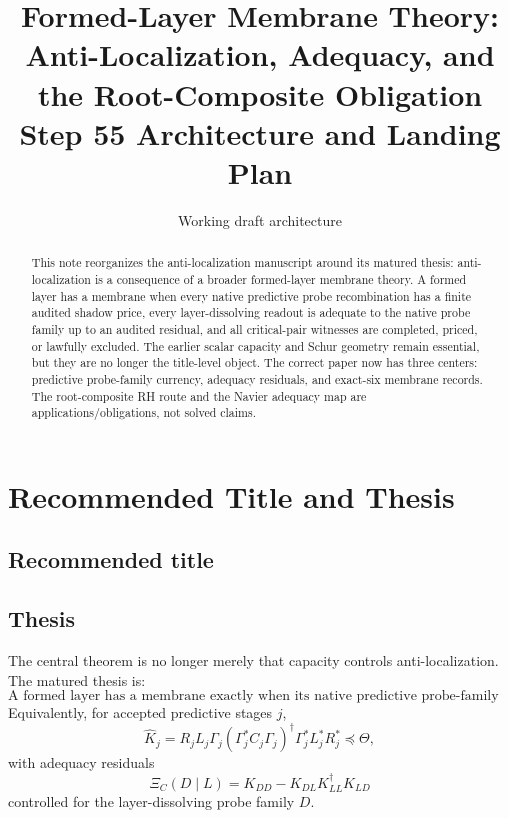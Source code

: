 \documentclass[11pt]{article}
\title{Formed-Layer Membrane Theory:\\ Anti-Localization, Adequacy, and the Root-Composite Obligation\\\large Step 55 Architecture and Landing Plan}
\author{Working draft architecture}
\date{}
\begin{document}
\maketitle

\begin{abstract}
This note reorganizes the anti-localization manuscript around its matured thesis: anti-localization is a consequence of a broader formed-layer membrane theory.  A formed layer has a membrane when every native predictive probe recombination has a finite audited shadow price, every layer-dissolving readout is adequate to the native probe family up to an audited residual, and all critical-pair witnesses are completed, priced, or lawfully excluded.  The earlier scalar capacity and Schur geometry remain essential, but they are no longer the title-level object.  The correct paper now has three centers: predictive probe-family currency, adequacy residuals, and exact-six membrane records.  The root-composite RH route and the Navier adequacy map are applications/obligations, not solved claims.
\end{abstract}

\section{Recommended Title and Thesis}

\subsection*{Recommended title}
\begin{center}
\end{center}

\subsection*{Thesis}
The central theorem is no longer merely that capacity controls anti-localization.  The matured thesis is:
\[
\boxed{
\text{A formed layer has a membrane exactly when its native predictive probe-family currency is budgeted and its layer-dissolving blind spots are controlled.}
}
\]
Equivalently, for accepted predictive stages $j$,
\[
\widehat K_j
=R_jL_j\Gamma_j(\Gamma_j^*C_j\Gamma_j)^\dagger\Gamma_j^*L_j^*R_j^*
\preceq \Theta,
\]
with adequacy residuals
\[
\Xi_C(D\mid L)
=K_{DD}-K_{DL}K_{LL}^{\dagger}K_{LD}
\]
controlled for the layer-dissolving probe family $D$.
\end{document}
